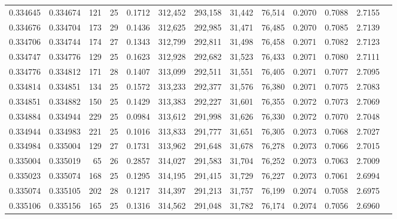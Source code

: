 \begin{tabular}{rrrrrrrrrrrrr}
0.334645 & 0.334674 &   121 &  25 &                                     0.1712 & 312,452 & 293,158 &  31,442 &  76,514 & 0.2070 & 0.7088 & 2.7155 \\
0.334676 & 0.334704 &   173 &  29 &                                     0.1436 & 312,625 & 292,985 &  31,471 &  76,485 & 0.2070 & 0.7085 & 2.7139 \\
0.334706 & 0.334744 &   174 &  27 &                                     0.1343 & 312,799 & 292,811 &  31,498 &  76,458 & 0.2071 & 0.7082 & 2.7123 \\
0.334747 & 0.334776 &   129 &  25 &                                     0.1623 & 312,928 & 292,682 &  31,523 &  76,433 & 0.2071 & 0.7080 & 2.7111 \\
0.334776 & 0.334812 &   171 &  28 &                                     0.1407 & 313,099 & 292,511 &  31,551 &  76,405 & 0.2071 & 0.7077 & 2.7095 \\
0.334814 & 0.334851 &   134 &  25 &                                     0.1572 & 313,233 & 292,377 &  31,576 &  76,380 & 0.2071 & 0.7075 & 2.7083 \\
0.334851 & 0.334882 &   150 &  25 &                                     0.1429 & 313,383 & 292,227 &  31,601 &  76,355 & 0.2072 & 0.7073 & 2.7069 \\
0.334884 & 0.334944 &   229 &  25 &                                     0.0984 & 313,612 & 291,998 &  31,626 &  76,330 & 0.2072 & 0.7070 & 2.7048 \\
0.334944 & 0.334983 &   221 &  25 &                                     0.1016 & 313,833 & 291,777 &  31,651 &  76,305 & 0.2073 & 0.7068 & 2.7027 \\
0.334984 & 0.335004 &   129 &  27 &                                     0.1731 & 313,962 & 291,648 &  31,678 &  76,278 & 0.2073 & 0.7066 & 2.7015 \\
0.335004 & 0.335019 &    65 &  26 &                                     0.2857 & 314,027 & 291,583 &  31,704 &  76,252 & 0.2073 & 0.7063 & 2.7009 \\
0.335023 & 0.335074 &   168 &  25 &                                     0.1295 & 314,195 & 291,415 &  31,729 &  76,227 & 0.2073 & 0.7061 & 2.6994 \\
0.335074 & 0.335105 &   202 &  28 &                                     0.1217 & 314,397 & 291,213 &  31,757 &  76,199 & 0.2074 & 0.7058 & 2.6975 \\
0.335106 & 0.335156 &   165 &  25 &                                     0.1316 & 314,562 & 291,048 &  31,782 &  76,174 & 0.2074 & 0.7056 & 2.6960 \\

\end{tabular}
